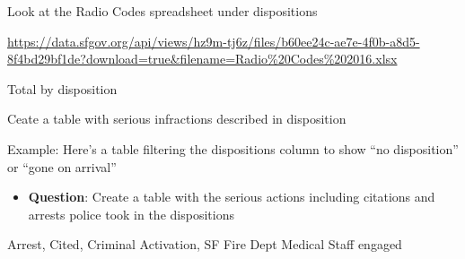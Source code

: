 \documentclass[]{book}
\newenvironment{Shaded}{\begin{snugshade}}{\end{snugshade}}
\newcommand{\KeywordTok}[1]{\textcolor[rgb]{0.13,0.29,0.53}{\textbf{#1}}}
\newcommand{\NormalTok}[1]{#1}
\newcommand{\OperatorTok}[1]{\textcolor[rgb]{0.81,0.36,0.00}{\textbf{#1}}}
\newcommand{\StringTok}[1]{\textcolor[rgb]{0.31,0.60,0.02}{#1}}
\providecommand{\tightlist}{%
  \setlength{\itemsep}{0pt}\setlength{\parskip}{0pt}}
\begin{document}
Look at the Radio Codes spreadsheet under dispositions

\url{https://data.sfgov.org/api/views/hz9m-tj6z/files/b60ee24c-ae7e-4f0b-a8d5-8f4bd29bf1de?download=true\&filename=Radio\%20Codes\%202016.xlsx}

Total by disposition

\begin{Shaded}
\end{Shaded}

Ceate a table with serious infractions described in disposition

Example: Here's a table filtering the dispositions column to show ``no disposition'' or ``gone on arrival''

\begin{Shaded}
\end{Shaded}

\begin{itemize}
\tightlist
\item
  \textbf{Question}: Create a table with the serious actions including citations and arrests police took in the dispositions
\end{itemize}

Arrest, Cited, Criminal Activation, SF Fire Dept Medical Staff engaged

\begin{Shaded}
\end{Shaded}
\end{document}
